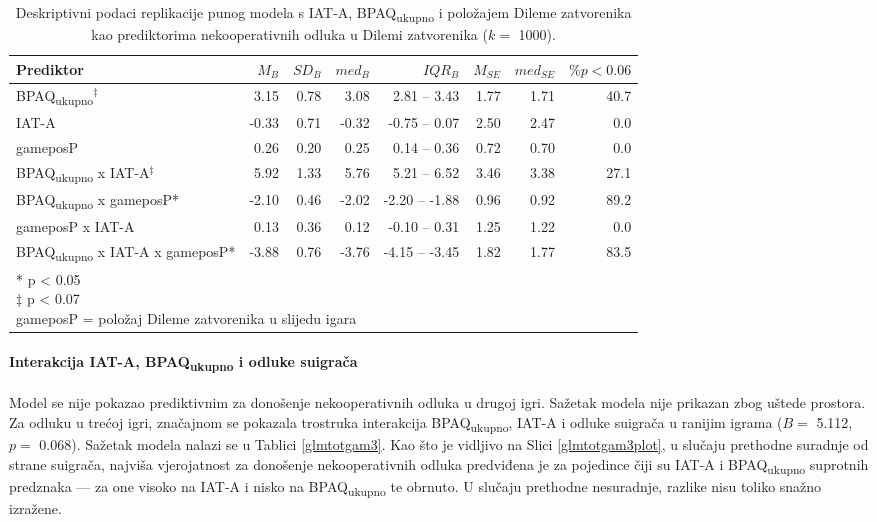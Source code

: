 \documentclass[a4paper, 12pt]{report}
\begin{document}
\begin{table}
    \begin{center}
        \caption{\label{deskr p robust} Deskriptivni podaci replikacije punog
            modela s IAT-A, BPAQ\textsubscript{ukupno} i položajem Dileme
            zatvorenika kao prediktorima nekooperativnih odluka u Dilemi
            zatvorenika ($k =$ 1000).}
        \hspace*{-0.8cm}\begin{tabular}{lrrrrrrr}
        \toprule
        Prediktor & $M_B$ & $SD_B$ & $med_B$ & $IQR_B$ & $M_{SE}$ & $med_{SE}$
        & $\% p < 0.06$\\
        \midrule
        BPAQ\textsubscript{ukupno}$^\ddagger$ & 3.15 & 0.78 & 3.08 & 2.81 -- 3.43 &
        1.77 & 1.71 & 40.7\\
       IAT-A & -0.33 & 0.71 & -0.32 & -0.75 -- 0.07 & 2.50 & 2.47 & 0.0\\
       gameposP & 0.26 & 0.20 & 0.25 & 0.14 -- 0.36 & 0.72 & 0.70 & 0.0\\
       BPAQ\textsubscript{ukupno} x IAT-A$^\ddagger$ & 5.92 & 1.33 & 5.76 & 5.21 -- 6.52 &
        3.46 & 3.38 & 27.1\\
        BPAQ\textsubscript{ukupno} x gameposP* & -2.10 & 0.46 & -2.02 &
        -2.20 -- {-}1.88 & 0.96 & 0.92 & 89.2\\
       gameposP x IAT-A & 0.13 & 0.36 & 0.12 & -0.10 -- 0.31 & 1.25 & 1.22 & 0.0\\
       BPAQ\textsubscript{ukupno} x IAT-A x gameposP* & -3.88 & 0.76 & -3.76 &
        -4.15 -- {-}3.45 & 1.82 & 1.77 & 83.5\\
        \bottomrule
        \multicolumn{6}{l}{
            \parbox{9cm}{\scriptsize \vspace{3pt} 
                * p < 0.05\\
                $\ddagger$ p < 0.07\\
                gameposP = položaj Dileme zatvorenika u slijedu igara
        }}
    \end{tabular}
\end{center}
\end{table}

\paragraph{Interakcija IAT-A, BPAQ\textsubscript{ukupno} i odluke suigrača} 
Model se nije pokazao prediktivnim za donošenje nekooperativnih odluka u drugoj
igri. Sažetak modela nije prikazan zbog uštede prostora. 
Za odluku u trećoj igri, značajnom se pokazala trostruka interakcija
BPAQ\textsubscript{ukupno}, IAT-A i odluke suigrača u ranijim igrama ($B =$
5.112, $p =$ 0.068). Sažetak modela nalazi se u Tablici \ref{glmtotgam3}. Kao
što je vidljivo na Slici \ref{glmtotgam3plot}, u slučaju prethodne suradnje od
strane suigrača, najviša vjerojatnost za donošenje nekooperativnih odluka
predviđena je za pojedince čiji su IAT-A i BPAQ\textsubscript{ukupno} suprotnih
predznaka --- za one visoko na IAT-A i nisko na BPAQ\textsubscript{ukupno} te
obrnuto. U slučaju prethodne nesuradnje, razlike nisu toliko snažno izražene.
\end{document}
